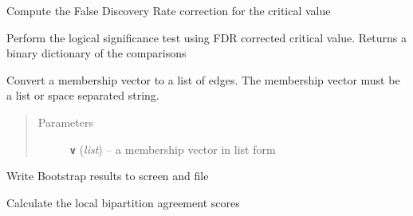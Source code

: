 \documentclass[letterpaper,10pt,english]{sphinxmanual}
\begin{document}
\begin{fulllineitems}
\begin{fulllineitems}
\label{Doc:Moduler.SupportClustering.FDR_correction}
Compute the False Discovery Rate correction for the critical value

\end{fulllineitems}


\begin{fulllineitems}
\label{Doc:Moduler.SupportClustering.FDRc_sigtest}
Perform the logical significance test using FDR corrected critical value. Returns a binary
dictionary of the comparisons

\end{fulllineitems}


\begin{fulllineitems}
\label{Doc:Moduler.SupportClustering.VectorToEdgeList}
Convert a membership vector to a list of edges.
The membership vector must be a list or space separated string.
\begin{quote}\begin{description}
\item[{Parameters}] \leavevmode
\textbf{\texttt{v}} (\emph{list}) -- a membership vector in list form

\end{description}\end{quote}

\end{fulllineitems}


\begin{fulllineitems}
\label{Doc:Moduler.SupportClustering.WriteBoot}
Write Bootstrap results to screen and file

\end{fulllineitems}


\begin{fulllineitems}
\label{Doc:Moduler.SupportClustering.bipartition_agreement}
Calculate the local bipartition agreement scores


\end{fulllineitems}
\end{fulllineitems}
\end{document}
